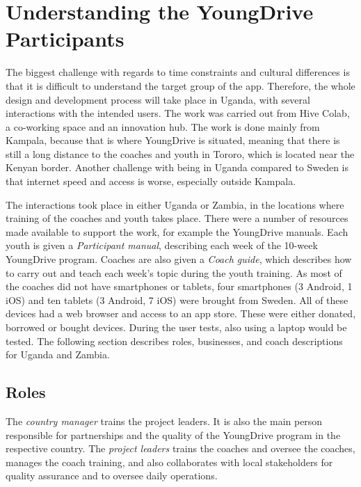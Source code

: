 \section{Understanding the YoungDrive Participants}

The biggest challenge with regards to time constraints and cultural differences is that it is difficult to understand the target group of the app. Therefore, the whole design and development process will take place in Uganda, with several interactions with the intended users. The work was carried out from Hive Colab, a co-working space and an innovation hub. The work is done mainly from Kampala, because that is where YoungDrive is situated, meaning that there is still a long distance to the coaches and youth in Tororo, which is located near the Kenyan border. Another challenge with being in Uganda compared to Sweden is that internet speed and access is worse, especially outside Kampala.

 The interactions took place in either Uganda or Zambia, in the locations where training of the coaches and youth takes place.  There were a number of resources made available to support the work, for example the YoungDrive manuals. Each youth is given a \textit{Participant manual}, describing each week of the 10-week YoungDrive program. Coaches are also given a \textit{Coach guide}, which describes how to carry out and teach each week's topic during the youth training. As most of the coaches did not have smartphones or tablets, four smartphones (3 Android, 1 iOS) and ten tablets (3 Android, 7 iOS) were brought from Sweden. All of these devices had a web browser and access to an app store. These were either donated, borrowed or bought devices. During the user tests, also using a laptop would be tested. The following section describes roles, businesses, and coach descriptions for Uganda and Zambia.

\subsection{Roles}

The \textit{country manager} trains the project leaders. It is also the main person responsible for partnerships and the quality of the YoungDrive program in the respective country. The \textit{project leaders} trains the coaches and oversee the coaches, manages the coach training, and also collaborates with local stakeholders for quality assurance and to oversee daily operations.

